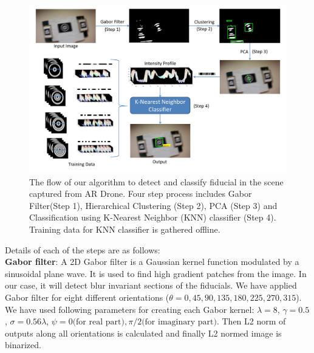 \documentclass[runningheads]{llncs}
\begin{document}

\begin{figure}[ht!]
\includegraphics[width=\linewidth]{overall_flow.pdf}
\caption{The flow of our algorithm to detect and classify fiducial in the scene
captured from AR Drone. Four step process includes Gabor Filter(Step 1),
Hierarchical Clustering (Step 2), PCA (Step 3) and Classification using
K-Nearest Neighbor (KNN) classifier (Step 4). Training data for KNN classifier is gathered
offline.}
\label{fig:overall_flow}
\end{figure}

\noindent Details of each of the steps are as follows:\\
\noindent\textbf{Gabor filter}: A 2D Gabor filter is a Gaussian kernel function
modulated by a sinusoidal plane wave. It is used to find high gradient patches from the
image. In our case, it will detect blur invariant sections of the fiducials. We
have applied Gabor filter for eight different orientations ($\theta = 0, 45,
90, 135, 180, 225, 270, 315$). We have used following parameters for
creating each Gabor kernel: $\lambda = 8$, $\gamma = 0.5$, $\sigma =
0.56\lambda$, $\psi = 0 \text{(for real part)}, \pi/2 \text{(for imaginary
part)}$.
Then L2 norm of outputs along all orientations is calculated and finally L2
normed image is binarized.
\end{document}
